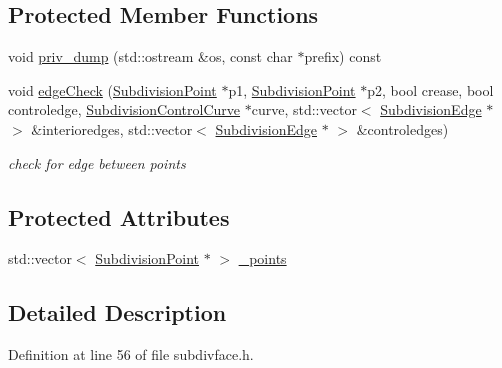 \subsection*{Protected Member Functions}
\begin{DoxyCompactItemize}
\item 
void \hyperlink{classShipCAD_1_1SubdivisionFace_ab2f647963b552728f40d8c329318676e}{priv\-\_\-dump} (std\-::ostream \&os, const char $\ast$prefix) const 
\item 
void \hyperlink{classShipCAD_1_1SubdivisionFace_a5399f7ec8ed458f6dbc733688c006cf8}{edge\-Check} (\hyperlink{classShipCAD_1_1SubdivisionPoint}{Subdivision\-Point} $\ast$p1, \hyperlink{classShipCAD_1_1SubdivisionPoint}{Subdivision\-Point} $\ast$p2, bool crease, bool controledge, \hyperlink{classShipCAD_1_1SubdivisionControlCurve}{Subdivision\-Control\-Curve} $\ast$curve, std\-::vector$<$ \hyperlink{classShipCAD_1_1SubdivisionEdge}{Subdivision\-Edge} $\ast$ $>$ \&interioredges, std\-::vector$<$ \hyperlink{classShipCAD_1_1SubdivisionEdge}{Subdivision\-Edge} $\ast$ $>$ \&controledges)
\begin{DoxyCompactList}\small\item\em check for edge between points \end{DoxyCompactList}\end{DoxyCompactItemize}
\subsection*{Protected Attributes}
\begin{DoxyCompactItemize}
\item 
std\-::vector$<$ \hyperlink{classShipCAD_1_1SubdivisionPoint}{Subdivision\-Point} $\ast$ $>$ \hyperlink{classShipCAD_1_1SubdivisionFace_ae1178fe10860c57e3e54a397b4dc7b4b}{\-\_\-points}
\end{DoxyCompactItemize}


\subsection{Detailed Description}


Definition at line 56 of file subdivface.\-h.



